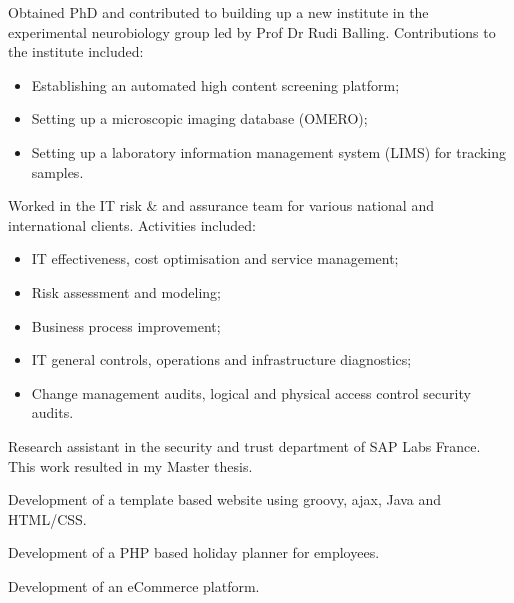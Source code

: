 \documentclass[11pt,a4paper,nolmodern, sans]{moderncv}        %
\begin{document}

{Obtained PhD and contributed to building up a new institute in the experimental neurobiology group led by Prof Dr Rudi Balling. \newline{} Contributions to the institute included:
\begin{itemize}%
	\item Establishing an automated high content screening platform;
	\item Setting up a microscopic imaging database (OMERO);
	\item Setting up a laboratory information management system (LIMS) for tracking samples.
\end{itemize}}


{Worked in the IT risk \& and assurance team for various national and international clients. \newline{} Activities included:
\begin{itemize}
	\item IT effectiveness, cost optimisation and service management;
	\item Risk assessment and modeling;
	\item Business process improvement;
	\item IT general controls, operations and infrastructure diagnostics;
	\item Change management audits, logical and physical access control security audits.
\end{itemize}}


{Research assistant in the security and trust department of SAP Labs France. This work resulted in my Master thesis.}

{Development of a template based website using groovy, ajax, Java and HTML/CSS.}{}

{Development of a PHP based holiday planner for employees.}

{Development of an eCommerce platform.}
\end{document}
